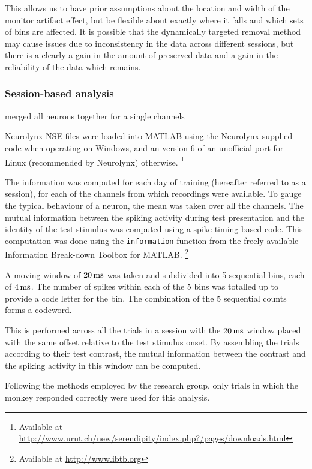 This allows us to have prior assumptions about the location and width of the monitor artifact effect, but be flexible about exactly where it falls and which sets of bins are affected.
It is possible that the dynamically targeted removal method may cause issues due to inconsistency in the data across different sessions, but there is a clearly a gain in the amount of preserved data and a gain in the reliability of the data which remains.

\FloatBarrier
\subsubsection{Session-based analysis}

merged all neurons together for a single channels

Neurolynx NSE files were loaded into MATLAB using the Neurolynx supplied code when operating on Windows, and an version 6 of an unofficial port for Linux (recommended by Neurolynx) otherwise.%
\footnote{Available at
\\ \url{http://www.urut.ch/new/serendipity/index.php?/pages/downloads.html}}

The information was computed for each day of training (hereafter referred to as a session), for each of the channels from which recordings were available. To gauge the typical behaviour of a neuron, the mean was taken over all the channels.
The mutual information between the spiking activity during test presentation and the identity of the test stimulus was computed
using a spike-timing based code.
This computation was done using the \verb|information| function from the freely available Information Break-down Toolbox \cite{Magri2009} for MATLAB.%
\footnote{Available at \url{http://www.ibtb.org}}

A moving window of $\unit[20]{ms}$ was taken and subdivided into 5 sequential bins, each of $\unit[4]{ms}$.
The number of spikes within each of the 5 bins was totalled up to provide a code letter for the bin.
The combination of the 5 sequential counts forms a codeword.

This is performed across all the trials in a session with the $\unit[20]{ms}$ window placed with the same offset relative to the test stimulus onset.
By assembling the trials according to their test contrast, the mutual information between the contrast and the spiking activity in this window can be computed.

Following the methods employed by the research group, only trials in which the monkey responded correctly were used for this analysis.

